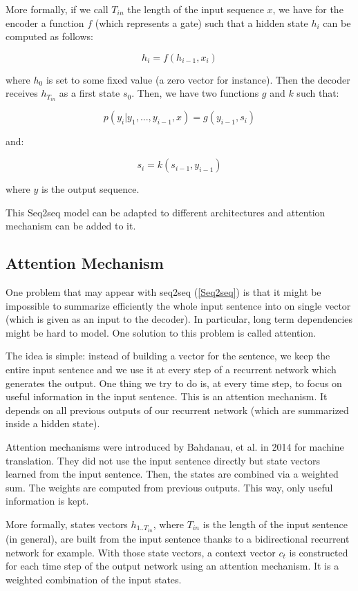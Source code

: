 \documentclass[11pt,a4paper,oldfontcommands]{memoir}
\begin{document}
More formally, if we call $T_{in}$ the length of the input sequence $x$, we have for the encoder a function $f$ (which represents a gate) such that a hidden state $h_i$ can be computed as follows:

\[ h_i = f(h_{i-1}, x_i)\]

where $h_0$ is set to some fixed value (a zero vector for instance). Then the decoder receives $h_{T_{in}}$ as a first state $s_0$. Then, we have two functions $g$ and $k$ such that:

\[ p(y_i|y_1,...,y_{i-1}, x) =  g(y_{i-1}, s_i)\]

and:

\[ s_i = k(s_{i-1}, y_{i-1})\]

where $y$ is the output sequence.

This Seq2seq model can be adapted to different architectures and attention mechanism can be added to it.

\subsection{Attention Mechanism}

One problem that may appear with seq2seq (\ref{Seq2seq}) is that it might be impossible to summarize efficiently the whole input sentence into on single vector (which is given as an input to the decoder). In particular, long term dependencies might be hard to model. One solution to this problem is called attention.

The idea is simple: instead of building a vector for the sentence, we keep the entire input sentence and we use it at every step of a recurrent network which generates the output. One thing we try to do is, at every time step, to focus on useful information in the input sentence. This is an attention mechanism. It depends on all previous outputs of our recurrent network (which are summarized inside a hidden state).

Attention mechanisms were introduced by Bahdanau, et al. in 2014 \cite{DBLP:journals/corr/BahdanauCB14} for machine translation. They did not use the input sentence directly but state vectors learned from the input sentence. Then, the states are combined via a weighted sum. The weights are computed from previous outputs. This way, only useful information is kept.

More formally, states vectors $h_{1..T_{in}}$, where $T_{in}$ is the length of the input sentence (in general), are built from the input sentence thanks to a bidirectional recurrent network for example. With those state vectors, a context vector $c_t$ is constructed for each time step of the output network using an attention mechanism. It is a weighted combination of the input states.
\end{document}
